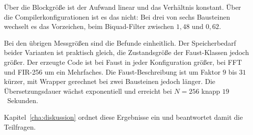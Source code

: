 Über die Blockgröße ist der Aufwand linear und das Verhältnis konstant. Über die Compilerkonfigurationen ist es das nicht: Bei drei von sechs Bausteinen wechselt es das Vorzeichen, beim Biquad-Filter zwischen $1{,}48$ und $0{,}62$.

Bei den übrigen Messgrößen sind die Befunde einheitlich. Der Speicherbedarf beider Varianten ist praktisch gleich, die Zustandsgröße der Faust-Klassen jedoch größer. Der erzeugte Code ist bei Faust in jeder Konfiguration größer, bei FFT und FIR-256 um ein Mehrfaches. Die Faust-Beschreibung ist um Faktor $9$ bis $31$ kürzer, mit Wrapper gerechnet bei zwei Bausteinen jedoch länger. Die Übersetzungsdauer wächst exponentiell und erreicht bei $N=256$ knapp $19$~Sekunden.

Kapitel~\ref{cha:diskussion} ordnet diese Ergebnisse ein und beantwortet damit die Teilfragen.
